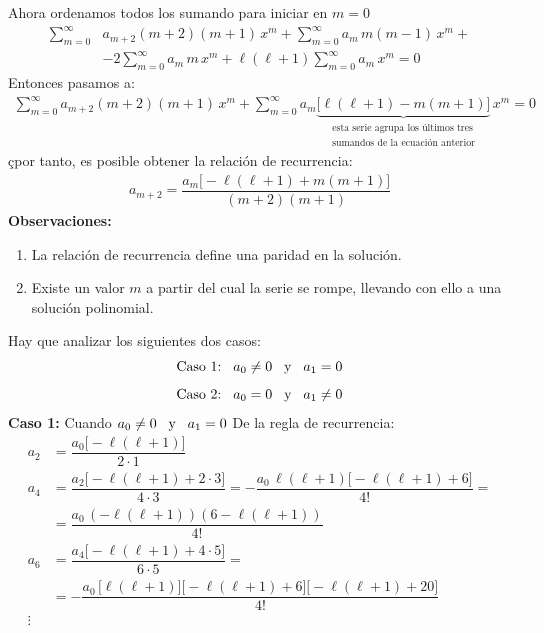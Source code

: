 Ahora ordenamos todos los sumando para iniciar en $m = 0$
\begin{align*}
\sum_{m=0}^{\infty} &a_{m+2} (m + 2) (m + 1) \, x^{m} + \sum_{m=0}^{\infty} a_{m} \, m (m - 1) \, x^{m} + \\[0.5em]
&- 2 \sum_{m=0}^{\infty} a_{m} \, m \, x^{m} + \ell (\ell + 1) \sum_{m=0}^{\infty} a_{m} \, x^{m} = 0
\end{align*}
Entonces pasamos a:
\begin{align*}
\sum_{m=0}^{\infty} a_{m+2} (m + 2) (m + 1) \, x^{m} + \sum_{m=0}^{\infty} a_{m} \underbrace{\big[ \ell (\ell + 1) - m (m + 1) \big]}_{\substack{\text{esta serie agrupa los últimos tres} \\ \text{sumandos de la ecuación anterior}}} \, x^{m} = 0
\end{align*}çpor tanto, es posible obtener la relación de recurrencia:
\begin{align*}
a_{m+2} = \dfrac{a_{m} \big[ - \ell (\ell + 1) + m (m + 1) \big]}{(m + 2)(m + 1)}
\end{align*}
\textbf{Observaciones:}
\begin{enumerate}
\item La relación de recurrencia define una paridad en la solución.
\item Existe un valor $m$ a partir del cual la serie se rompe, llevando con ello a una solución polinomial.
\end{enumerate}
Hay que analizar los siguientes dos casos:
\begin{align*}
\mbox{Caso 1:} \hspace{0.3cm} a_{0} \neq 0 \hspace{0.3cm} \mbox{y} \hspace{0.3cm} a_{1} = 0 \\[0.5em]
\mbox{Caso 2:} \hspace{0.3cm} a_{0} = 0 \hspace{0.3cm} \mbox{y} \hspace{0.3cm} a_{1} \neq 0
\end{align*}
\textbf{Caso 1:} Cuando $a_{0} \neq 0 \hspace{0.3cm} \mbox{y} \hspace{0.3cm} a_{1} = 0$
De la regla de recurrencia:
\begin{align*}
a_{2} &= \dfrac{a_{0} \big[ - \ell (\ell +  1) \big]}{2 \cdot 1} \\[0.5em]
a_{4} &= \dfrac{a_{2} \big[ - \ell (\ell +  1) + 2 \cdot 3 \big]}{4 \cdot 3} = - \dfrac{a_{0} \, \ell (\ell + 1) \big[- \ell (\ell + 1) + 6 \big]}{4!} = \\[0.5em]
&= \dfrac{a_{0} \, ( - \ell (\ell + 1)) ( 6 - \ell (\ell + 1))}{4!} \\[0.5em]
a_{6} &= \dfrac{ a_{4} \big[ - \ell (\ell +  1) + 4 \cdot 5 \big] }{6 \cdot 5} = \\[0.5em]
&= - \dfrac{a_{0} \, \big[ \ell (\ell + 1) \big] \big[ - \ell (\ell + 1) + 6 \big] \big[ -\ell (\ell + 1) + 20 \big]}{4!} \\[0.5em]
\vdots
\end{align*}
